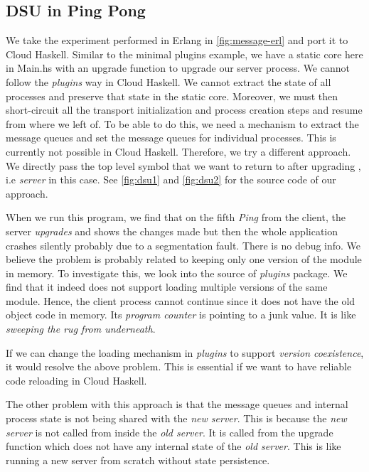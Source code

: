 \subsection{DSU in Ping Pong}
\label{sec:dsu-pingpong}

We take the experiment performed in Erlang in
\autoref{fig:message-erl} and port it to Cloud Haskell. Similar to the
minimal plugins example, we have a static core here in Main.hs with an
upgrade function to upgrade our server process. We cannot follow the
\emph{plugins} way in Cloud Haskell. We cannot extract the state of
all processes and preserve that state in the static core. Moreover, we
must then short-circuit all the transport initialization and process
creation steps and resume from where we left of.  To be able to do
this, we need a mechanism to extract the message queues and set the
message queues for individual processes. This is currently not
possible in Cloud Haskell.  Therefore, we try a different approach. We
directly pass the top level symbol that we want to return to after
upgrading , i.e \emph{server} in this case. See \autoref{fig:dsu1} and
\autoref{fig:dsu2} for the source code of our approach.

When we run this program, we find that on the fifth \emph{Ping} from
the client, the server \emph{upgrades} and shows the changes made but
then the whole application crashes silently probably due to a
segmentation fault. There is no debug
info. We believe the problem is probably related to keeping only one
version of the module in memory. To investigate this, we look into the
source of \emph{plugins} package. We find that it indeed does not
support loading multiple versions of the same module. Hence, the
client process cannot continue since it does not have the old object
code in memory. Its \emph{program counter} is pointing to a
junk value. It is like \emph{sweeping the rug from underneath}.

If we can change the loading mechanism in \emph{plugins} to support
\emph{version coexistence}, it would resolve the above problem. This
is essential if we want to have reliable code reloading in Cloud
Haskell.

The other problem with this approach is that the message queues and
internal process state is not being shared with the \emph{new server}.
This is because the \emph{new server} is not called from inside the
\emph{old server}. It is called from the upgrade function which does
not have any internal state of the \emph{old server}. This is like
running a new server from scratch without state persistence.


